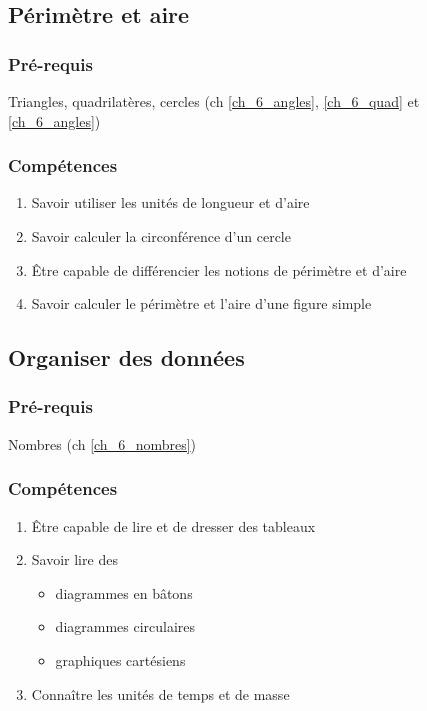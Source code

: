 \subsection{Périmètre et aire}\label{ch_6_peri}

\subsubsection*{Pré-requis}
 Triangles, quadrilatères, cercles (ch \ref{ch_6_angles}, \ref{ch_6_quad} et \ref{ch_6_angles})
 
 \subsubsection*{Compétences}
\begin{enumerate}
	\item Savoir utiliser les unités de longueur et d'aire
	\item Savoir calculer la circonférence d'un cercle
	\item Être capable de différencier les notions de périmètre et d'aire
	\item Savoir calculer le périmètre et l'aire d'une figure simple
\end{enumerate}

\subsection{Organiser des données}\label{ch_6_data}

\subsubsection*{Pré-requis}
 Nombres (ch \ref{ch_6_nombres})
 
 \subsubsection*{Compétences}
\begin{enumerate}
	\item Être capable de lire et de dresser des tableaux
	\item Savoir lire des 
	\begin{itemize}
		\item diagrammes en bâtons
		\item diagrammes circulaires
		\item graphiques cartésiens
	\end{itemize}
	\item Connaître les unités de temps et de masse
\end{enumerate}